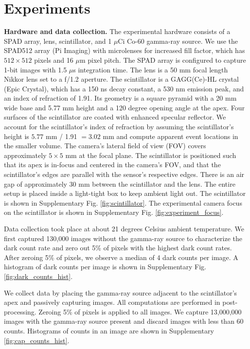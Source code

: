 \section{Experiments}
\textbf{Hardware and data collection.}
The experimental hardware consists of a SPAD array, lens, scintillator, and 1 $\mu$Ci Co-60 gamma-ray source.
We use the SPAD512 array (Pi Imaging) with microlenses for increased fill factor, 
which has $512 \times 512$ pixels and 16 $\mu$m pixel pitch.
The SPAD array is configured to capture 1-bit images with 1.5 $\mu$s 
integration time.
The lens is a 50 mm focal length Nikkor lens set to a f/1.2 aperture.
The scintillator is a GAGG(Ce)-HL crystal (Epic Crystal), which has a 150 ns decay 
constant, a 530 nm emission peak, and an index of refraction of 1.91.
Its geometry is a square pyramid with a 20 mm wide base and 5.77 mm 
height and a 120 degree opening angle at the apex.
Four surfaces of the scintillator are coated with enhanced specular reflector.
We account for the scintillator's index of refraction by assuming the 
scintillator's height is $5.77$ mm  / 1.91 $=3.02$ mm and compute apparent event 
locations in the smaller volume.
The camera's lateral field of view (FOV) covers approximately $5 \times 5$ mm at 
the focal plane.
The scintillator is positioned such that its apex is in-focus and centered in the 
camera's FOV, and that the scintillator's edges are parallel with the sensor's 
respective edges.
There is an air gap of approximately 30 mm between the scintillator and the lens.
The entire setup is placed inside a light-tight box to keep ambient light out.
The scintillator is shown in Supplementary Fig. \ref*{fig:scintillator}.
The experimental camera focus on the scintillator is shown in Supplementary Fig. \ref*{fig:experiment_focus}. 

Data collection took place at about 21 degrees Celsius ambient temperature.
We first captured 130,000 images without the gamma-ray source to characterize the 
dark count rate and zero out 5\% of pixels with the highest dark count rates.
After zeroing 5\% of pixels, we observe a median of 4 dark counts per image.
A histogram of dark counts per image is shown in Supplementary Fig. \ref*{fig:dark_counts_hist}.

We collect data by placing the gamma-ray source adjacent to the scintillator's 
apex and passively capturing images.
All computations are performed in post-processing.
Zeroing 5\% of pixels is applied to all images.
We capture 13,000,000 images with the gamma-ray source present and 
discard images with less than 60 counts.
Histograms of counts in an image are shown in Supplementary \cref*{fig:cap_counts_hist}.

